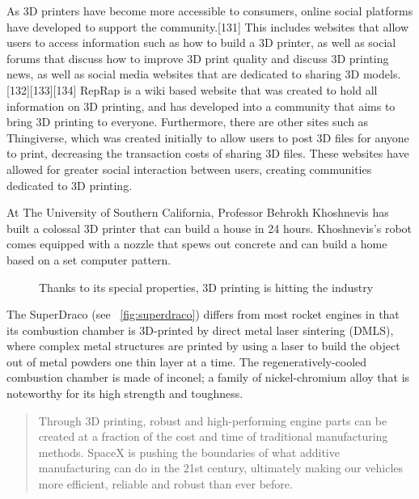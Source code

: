 As 3D printers have become more accessible to consumers, online social platforms have developed to support the community.[131] This includes websites that allow users to access information such as how to build a 3D printer, as well as social forums that discuss how to improve 3D print quality and discuss 3D printing news, as well as social media websites that are dedicated to sharing 3D models.[132][133][134]
RepRap is a wiki based website that was created to hold all information on 3D printing, and has developed into a community that aims to bring 3D printing to everyone. Furthermore, there are other sites such as Thingiverse, which was created initially to allow users to post 3D files for anyone to print, decreasing the transaction costs of sharing 3D files. These websites have allowed for greater social interaction between users, creating communities dedicated to 3D printing.

At The University of Southern California, Professor Behrokh Khoshnevis has built a colossal 3D printer that can build a house in 24 hours. Khoshnevis's robot comes equipped with a nozzle that spews out concrete and can build a home based on a set computer pattern.



\begin{figure}[h]
\centering
    \hfil
    \caption{Thanks to its special properties, 3D printing is hitting the industry}
    \label{fig:3D_printed_objects}
\end{figure}

The SuperDraco (see \figurename~\ref{fig:superdraco}) differs from most rocket engines in that its combustion chamber is 3D-printed by direct metal laser sintering (DMLS), where complex metal structures are printed by using a laser to build the object out of metal powders one thin layer at a time. The regeneratively-cooled combustion chamber is made of inconel; a family of nickel-chromium alloy that is noteworthy for its high strength and toughness.

\begin{quotation}
    Through 3D printing, robust and high-performing engine parts can be created at a fraction of the cost and time of traditional manufacturing methods. SpaceX is pushing the boundaries of what additive manufacturing can do in the 21st century, ultimately making our vehicles more efficient, reliable and robust than ever before.
\end{quotation}


